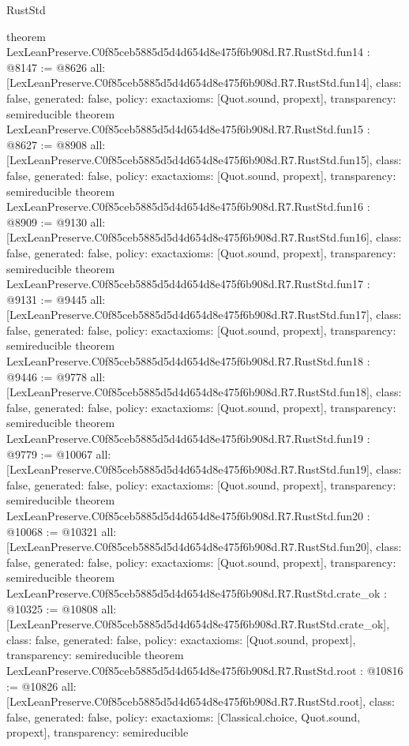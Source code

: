 \begin{lexlean}{RustStd}
\begin{coremodule}
{}
theorem LexLeanPreserve.C0f85ceb5885d5d4d654d8e475f6b908d.R7.RustStd.fun14 : @8147 := @8626 {
  all: [LexLeanPreserve.C0f85ceb5885d5d4d654d8e475f6b908d.R7.RustStd.fun14],
  class: false,
  generated: false,
  policy: exact{axioms: [Quot.sound, propext]},
  transparency: semireducible
}
theorem LexLeanPreserve.C0f85ceb5885d5d4d654d8e475f6b908d.R7.RustStd.fun15 : @8627 := @8908 {
  all: [LexLeanPreserve.C0f85ceb5885d5d4d654d8e475f6b908d.R7.RustStd.fun15],
  class: false,
  generated: false,
  policy: exact{axioms: [Quot.sound, propext]},
  transparency: semireducible
}
theorem LexLeanPreserve.C0f85ceb5885d5d4d654d8e475f6b908d.R7.RustStd.fun16 : @8909 := @9130 {
  all: [LexLeanPreserve.C0f85ceb5885d5d4d654d8e475f6b908d.R7.RustStd.fun16],
  class: false,
  generated: false,
  policy: exact{axioms: [Quot.sound, propext]},
  transparency: semireducible
}
theorem LexLeanPreserve.C0f85ceb5885d5d4d654d8e475f6b908d.R7.RustStd.fun17 : @9131 := @9445 {
  all: [LexLeanPreserve.C0f85ceb5885d5d4d654d8e475f6b908d.R7.RustStd.fun17],
  class: false,
  generated: false,
  policy: exact{axioms: [Quot.sound, propext]},
  transparency: semireducible
}
theorem LexLeanPreserve.C0f85ceb5885d5d4d654d8e475f6b908d.R7.RustStd.fun18 : @9446 := @9778 {
  all: [LexLeanPreserve.C0f85ceb5885d5d4d654d8e475f6b908d.R7.RustStd.fun18],
  class: false,
  generated: false,
  policy: exact{axioms: [Quot.sound, propext]},
  transparency: semireducible
}
theorem LexLeanPreserve.C0f85ceb5885d5d4d654d8e475f6b908d.R7.RustStd.fun19 : @9779 := @10067 {
  all: [LexLeanPreserve.C0f85ceb5885d5d4d654d8e475f6b908d.R7.RustStd.fun19],
  class: false,
  generated: false,
  policy: exact{axioms: [Quot.sound, propext]},
  transparency: semireducible
}
theorem LexLeanPreserve.C0f85ceb5885d5d4d654d8e475f6b908d.R7.RustStd.fun20 : @10068 := @10321 {
  all: [LexLeanPreserve.C0f85ceb5885d5d4d654d8e475f6b908d.R7.RustStd.fun20],
  class: false,
  generated: false,
  policy: exact{axioms: [Quot.sound, propext]},
  transparency: semireducible
}
theorem LexLeanPreserve.C0f85ceb5885d5d4d654d8e475f6b908d.R7.RustStd.crate_ok : @10325 := @10808 {
  all: [LexLeanPreserve.C0f85ceb5885d5d4d654d8e475f6b908d.R7.RustStd.crate_ok],
  class: false,
  generated: false,
  policy: exact{axioms: [Quot.sound, propext]},
  transparency: semireducible
}
theorem LexLeanPreserve.C0f85ceb5885d5d4d654d8e475f6b908d.R7.RustStd.root : @10816 := @10826 {
  all: [LexLeanPreserve.C0f85ceb5885d5d4d654d8e475f6b908d.R7.RustStd.root],
  class: false,
  generated: false,
  policy: exact{axioms: [Classical.choice, Quot.sound, propext]},
  transparency: semireducible
}


\end{coremodule}
\end{lexlean}
